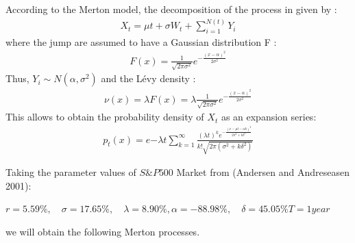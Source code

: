 \documentclass[12pt]{report}
\begin{document}
According to the Merton model, the decomposition of the process in given by :
\begin{gather}
X_t = \mu t+\sigma W_t+\sum_{i=1}^{N(t)} Y_i
\label{baz}
\end{gather}
where the jump  are assumed to have a Gaussian distribution F :
\begin{gather}
F(x) = \frac{1}{\sqrt{2\pi\sigma^2} } e^{ -\frac{(x-\alpha)^2}{2\sigma^2} }
\end{gather}
Thus, $Y_i  \sim N(\alpha,\sigma^2)$ and the Lévy density :
\begin{gather}
 \nu(x)=\lambda F(x)=\lambda\frac{1}{\sqrt{2\pi\sigma^2} } e^{ -\frac{(x-\alpha)^2}{2\sigma^2} }
\end{gather}
This allows to obtain the probability density of $X_t$ as an expansion series: 
\begin{gather}
p_t(x)=e{-\lambda t} \sum_{k=1}^{\infty} \frac{(\lambda t)^k  e^{ -\frac{(x-\mu t-\alpha k)^2}{2\sigma^2+k \delta^2}}}{k!  \sqrt{2\pi(\sigma^2+k \delta^2)}}
\end{gather}

Taking the parameter values of $S\&P500$ Market from (Andersen and Andreseasen 2001):

$ r =5.59 \%,\quad \sigma=17.65\%,\quad  \lambda=8.90\%, \alpha=-88.98\%,\quad  \delta=45.05\%  T=1 year $

we will obtain the following Merton processes. \\
\end{document}
